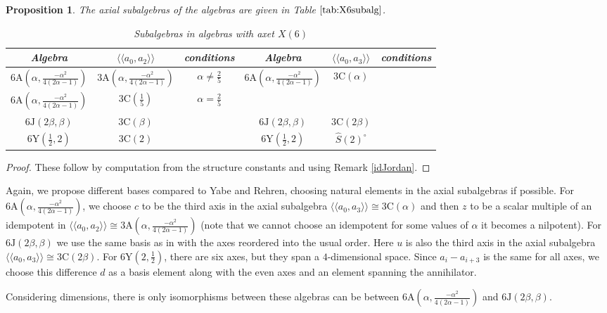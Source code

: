 \documentclass[11pt, a4paper]{article}
\theoremstyle{plain}
\newtheorem{proposition}[theorem]{Proposition}
\theoremstyle{definition}
\newcommand\al{\alpha}
\newcommand\bt{\beta}
\newcommand\lla{\langle\!\langle}
\newcommand\rra{\rangle\!\rangle}
\newcommand{\A}{\mathrm{A}}
\newcommand{\C}{\mathrm{C}}
\newcommand{\J}{\mathrm{J}}
\newcommand{\Y}{\mathrm{Y}}
\newcommand{\Cl}{\widehat{S}(2)^\circ} %
\newcommand{\0}{\overline{0}}
\newcommand{\2}{\overline{2}}
\newcommand{\1}{\mathbbm{1}}
\begin{document}
\begin{proposition}
The axial subalgebras of the algebras are given in Table $\ref{tab:X6subalg}$.
\begin{table}[h!tb]
\centering
\renewcommand{\arraystretch}{1.3}
\begin{tabular}{ccc|ccc}
\hline
Algebra & $\lla a_0, a_2 \rra$ & conditions & Algebra &  $\lla a_0, a_3 \rra$ &conditions\\
\hline
$6\A(\al, \frac{-\al^2}{4(2\al-1)})$ & $3\A(\al, \frac{-\al^2}{4(2\al-1)})$ & $\al \neq \frac{2}{5}$    & $6\A(\al, \frac{-\al^2}{4(2\al-1)})$ & $3\C(\al)$ & \\
$6\A(\al, \frac{-\al^2}{4(2\al-1)})$ & $3\C(\frac{1}{5})$ & $\al = \frac{2}{5}$    &  &  & \\
$6\J(2\bt, \bt)$  & $3\C(\bt)$ &  & $6\J(2\bt, \bt)$  & $3\C(2\bt)$ & \\
$6\Y( \frac{1}{2}, 2)$ & $3\C(2)$ &    & $6\Y( \frac{1}{2}, 2)$ & $\Cl$ & \\
\hline
\end{tabular}
\caption{Subalgebras in algebras with axet $X(6)$}\label{tab:X6subalg}
\end{table}
\end{proposition}
\begin{proof}
These follow by computation from the structure constants and using Remark \ref{idJordan}.
\end{proof}



Again, we propose different bases compared to Yabe and Rehren, choosing natural elements in the axial subalgebras if possible.  For $6\A(\al, \frac{-\al^2}{4(2\al-1)})$, we choose $c$ to be the third axis in the axial subalgebra $\lla a_0, a_3 \rra \cong 3\C(\al)$ and then $z$ to be a scalar multiple of an idempotent in $\lla a_0, a_2 \rra \cong 3\A(\al, \frac{-\al^2}{4(2\al-1)})$ (note that we cannot choose an idempotent for some values of $\al$ it becomes a nilpotent).  For $6\J(2\bt,\bt)$ we use the same basis as in \cite{doubleMatsuo} with the axes reordered into the usual order.  Here $u$ is also the third axis in the axial subalgebra $\lla a_0, a_3 \rra \cong 3\C(2\bt)$.  For $6\Y(2, \frac{1}{2})$, there are six axes, but they span a $4$-dimensional space.  Since $a_i - a_{i+3}$ is the same for all axes, we choose this difference $d$ as a basis element along with the even axes and an element spanning the annihilator.

Considering dimensions, there is only isomorphisms between these algebras can be between $6\A(\al, \frac{-\al^2}{4(2\al-1)})$ and $6\J(2\bt, \bt)$.
\end{document}
